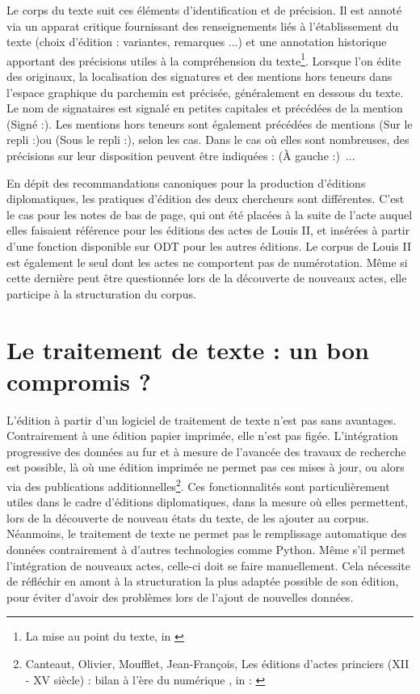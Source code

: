 \par Le corps du texte suit ces éléments d'identification et de précision. Il est annoté via un apparat critique fournissant des renseignements liés à l'établissement du texte (choix d'édition : variantes, remarques ...) et une annotation historique apportant des précisions utiles à la compréhension du texte\footnote{\og La mise au point du texte\fg, in \cite{guyotjeanninConseilsPourEdition2009}}. Lorsque l'on édite des originaux, la localisation des signatures et des mentions hors teneurs dans l'espace graphique du parchemin est précisée, généralement en dessous du texte. Le nom de signataires est signalé en petites capitales et précédées de la mention \og (Signé :)\fg. Les mentions hors teneurs sont également précédées de mentions \og (Sur le repli :)\fg \space ou \og(Sous le repli :)\fg, selon les cas. Dans le cas où elles sont nombreuses, des précisions sur leur disposition peuvent être indiquées : \og(À gauche :)\fg ~...

\par En dépit des recommandations canoniques pour la production d'éditions diplomatiques, les pratiques d'édition des deux chercheurs sont différentes. C'est le cas pour les notes de bas de page, qui ont été placées à la suite de l'acte auquel elles faisaient référence pour les éditions des actes de Louis II, et insérées à partir d'une fonction disponible sur ODT pour les autres éditions. Le corpus de Louis II est également le seul dont les actes ne comportent pas de numérotation. Même si cette dernière peut être questionnée lors de la découverte de nouveaux actes, elle participe à la structuration du corpus. 
\newpage 

\section{Le traitement de texte : un bon compromis ?}
\label{I.2.3}

\par L'édition à partir d'un logiciel de traitement de texte n'est pas sans avantages. Contrairement à une édition papier imprimée, elle n'est pas figée. L'intégration progressive des données au fur et à mesure de l'avancée des travaux de recherche est possible, là où une édition imprimée ne permet pas ces mises à jour, ou alors via des publications additionnelles\footnote{Canteaut, Olivier, Moufflet, Jean-François, \og Les éditions d'actes princiers (\textsc{XII} - \textsc{XV} siècle) : bilan à l'ère du numérique \fg, in : \cite{guyotjeanninJeanBerryEcrit2019}}. Ces fonctionnalités sont particulièrement utiles dans le cadre d'éditions diplomatiques, dans la mesure où elles permettent, lors de la découverte de nouveau états du texte, de les ajouter au corpus. Néanmoins, le traitement de texte ne permet pas le remplissage automatique des données contrairement à d'autres technologies comme Python. Même s'il permet l'intégration de nouveaux actes, celle-ci doit se faire manuellement. Cela nécessite de réfléchir en amont à la structuration la plus adaptée possible de son édition, pour éviter d'avoir des problèmes lors de l'ajout de nouvelles données. 
\newline 

